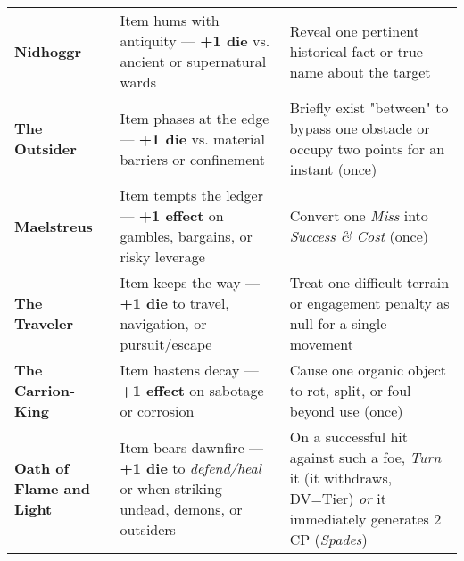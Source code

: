 \documentclass[12pt,twoside]{book}
\begin{document}
\begin{table}[htbp]
\begin{tabular}{>{\bfseries}p{3.2cm} >{\raggedright\arraybackslash}p{6.1cm} >{\raggedright\arraybackslash}p{6.1cm}}
Nidhoggr & Item hums with antiquity — \textbf{+1 die} vs. ancient or supernatural wards & Reveal one pertinent historical fact or true name about the target \\
The Outsider & Item phases at the edge — \textbf{+1 die} vs. material barriers or confinement & Briefly exist "between" to bypass one obstacle or occupy two points for an instant (once) \\
Maelstreus & Item tempts the ledger — \textbf{+1 effect} on gambles, bargains, or risky leverage & Convert one \emph{Miss} into \emph{Success \& Cost} (once) \\
The Traveler & Item keeps the way — \textbf{+1 die} to travel, navigation, or pursuit/escape & Treat one difficult-terrain or engagement penalty as null for a single movement \\
The Carrion-King & Item hastens decay — \textbf{+1 effect} on sabotage or corrosion & Cause one organic object to rot, split, or foul beyond use (once) \\
Oath of Flame and Light & Item bears dawnfire — \textbf{+1 die} to \emph{defend/heal} or when striking undead, demons, or outsiders & On a successful hit against such a foe, \emph{Turn} it (it withdraws, DV=Tier) \emph{or} it immediately generates 2 CP (\emph{Spades}) \\
\bottomrule
\end{tabular}
\end{table}
\end{document}
